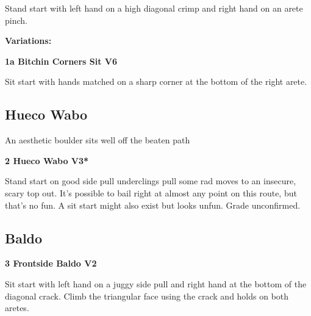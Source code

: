 \begin{multicols}{2}
			\begin{adjustwidth}{0.5cm}{}				
			Stand start with left hand on a high diagonal crimp and right hand on an arete pinch.
			\end{adjustwidth}
				\begin{adjustwidth}{0.5cm}{}				
				\textbf{Variations:} \newline
					\label{vr:Bitchin Corners Sit}
\colorbox{RoyalBlue!20}{
\parbox{0.95\linewidth}{
\textbf{
1a Bitchin Corners Sit V6  
}
}
}

					\begin{adjustwidth}{0.5cm}{}				
					Sit start with hands matched on a sharp corner at the bottom of the right arete.
					\end{adjustwidth}
				\end{adjustwidth}
		\subsection*{Hueco Wabo}\label{bf:Hueco Wabo}
		An aesthetic boulder sits well off the beaten path\\
	

			\label{rt:Hueco Wabo}
\colorbox{green!20}{
\parbox{0.95\linewidth}{
\textbf{
2 Hueco Wabo V3*  
}
}
}

			\begin{adjustwidth}{0.5cm}{}				
			Stand start on good side pull underclings pull some rad moves to an insecure, scary top out. It's possible to bail right at almost any point on this route, but that's no fun. A sit start might also exist but looks unfun. Grade unconfirmed.
			\end{adjustwidth}
		\subsection*{Baldo}\label{bf:Baldo}
			

			\label{rt:Frontside Baldo}
\colorbox{green!20}{
\parbox{0.95\linewidth}{
\textbf{
3 Frontside Baldo V2  
}
}
}

			\begin{adjustwidth}{0.5cm}{}				
			Sit start with left hand on a juggy side pull and right hand at the bottom of the diagonal crack. Climb the triangular face using the crack and holds on both aretes.
			\end{adjustwidth}

\end{multicols}
